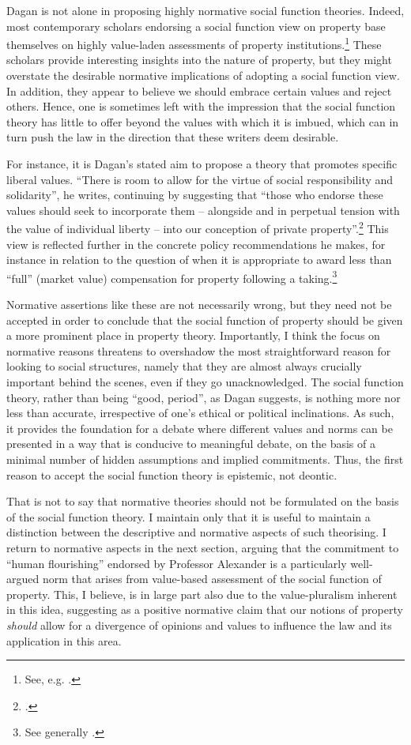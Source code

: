 Dagan is not alone in proposing highly normative social function theories. Indeed, most contemporary scholars endorsing a social function view on property base themselves on highly value-laden assessments of property institutions.\footnote{See, e.g. \cite{alexander09,crawford11,davidson11,singer09,penalver09}.} These scholars provide interesting insights into the nature of property, but they might overstate the desirable normative implications of adopting a social function view. In addition, they appear to believe we should embrace certain values and reject others. Hence, one is sometimes left with the impression that the social function theory has little to offer beyond the values with which it is imbued, which can in turn push the law in the direction that these writers deem desirable. 

For instance, it is Dagan's stated aim to propose a theory that promotes specific liberal values. ``There is room to allow for the virtue of social responsibility and solidarity'', he writes, continuing by suggesting that ``those who endorse these values should seek to incorporate them -- alongside and in perpetual tension with the value of individual liberty -- into our conception of private property''.\footcite[802]{dagan99} This view is reflected further in the concrete policy recommendations he makes, for instance in relation to the question of when it is appropriate to award less than ``full'' (market value) compensation for property following a taking.\footnote{See generally \cite{dagan14b}.}

Normative assertions like these are not necessarily wrong, but they need not be accepted in order to conclude that the social function of property should be given a more prominent place in property theory. Importantly, I think the focus on normative reasons threatens to overshadow the most straightforward reason for looking to social structures, namely that they are almost always crucially important behind the scenes, even if they go unacknowledged. The social function theory, rather than being ``good, period'', as Dagan suggests, is nothing more nor less than accurate, irrespective of one's ethical or political inclinations. As such, it provides the foundation for a debate where different values and norms can be presented in a way that is conducive to meaningful debate, on the basis of a minimal number of hidden assumptions and implied commitments. Thus, the first reason to accept the social function theory is epistemic, not deontic.

That is not to say that normative theories should not be formulated on the basis of the social function theory. I maintain only that  it is useful to maintain a distinction  between the descriptive and normative aspects of such theorising. I return to normative aspects in the next section, arguing that the commitment to ``human flourishing'' endorsed by Professor Alexander is a particularly well-argued norm that arises from value-based assessment of the social function of property. This, I believe, is in large part also due to the value-pluralism inherent in this idea, suggesting as a positive normative claim that our notions of property {\it should} allow for a divergence of opinions and values to influence the law and its application in this area.

